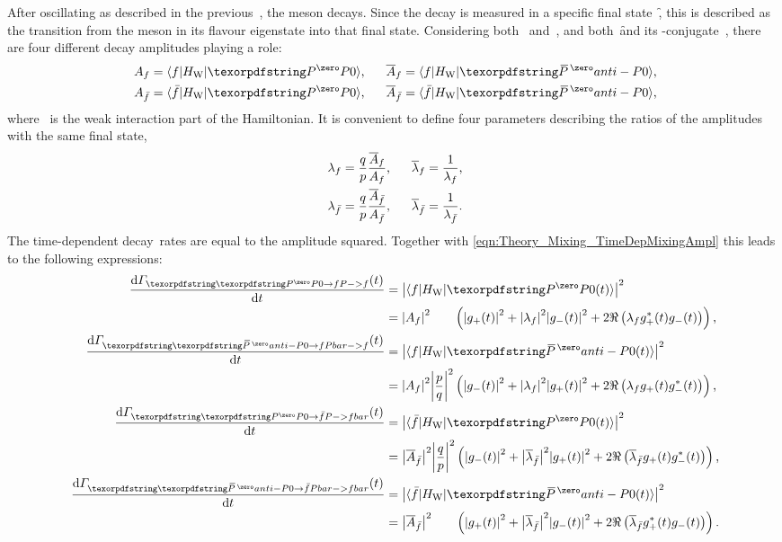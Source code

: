 After oscillating as described in the previous~, the meson decays.
Since the decay is measured in a specific final state~\f, this is described as the transition from the meson in its flavour eigenstate into that final state.
Considering both~\ket{\pz} and~\ket{\pzb}, and both~\f and its \CP-conjugate~\fb, there are four different decay amplitudes playing a role:
%
\begin{equation}
    \begin{alignedat}{2}
        \Af  &= \braxket{\f} {\Hweak}{\pz} \rlap{,} & \qquad \Abf  &= \braxket{\f} {\Hweak}{\pzb} \rlap{,} \\
        \Afb &= \braxket{\fb}{\Hweak}{\pz} \rlap{,} &        \Abfb &= \braxket{\fb}{\Hweak}{\pzb} \rlap{,} \\
    \end{alignedat}
\end{equation}
%
where \Hweak~is the weak interaction part of the Hamiltonian.
It is convenient to define four parameters describing the ratios of the amplitudes with the same final state,
%
\begin{equation}
    \begin{alignedat}{2}
        \lf   &= \frac{q}{p} \frac{\Abf}{\Af}   \rlap{,} & \qquad \lbf  &= \dfrac{1}{\lf}  \rlap{,} \\
        \lfb  &= \frac{q}{p} \frac{\Abfb}{\Afb} \rlap{,} &        \lbfb &= \dfrac{1}{\lfb} \rlap{.}
    \end{alignedat}
\end{equation}
%
The time-dependent decay~rates are equal to the amplitude squared.
Together with \cref{eqn:Theory_Mixing_TimeDepMixingAmpl} this leads to the following expressions:
%
\begin{align*}
    \dfrac{\deriv\Gamma_{\PzF} (t)} {\deriv t} &= \abs{\braxket{\f}{\Hweak}{\pz(t)}}^{2}   \\
        &= \abs{\Af}^{2}   \hphantom{\abs{\dfrac{q}{p}}^{2}} \left(\abs{\gpt}^{2} + \abs{\lf  }^{2} \abs{\gmt}^{2} + 2\Re\left(\lf   \gpst \gmt  \right)\right) \rlap{,} \\
    \dfrac{\deriv\Gamma_{\PzbF}(t)} {\deriv t} &= \abs{\braxket{\f}{\Hweak}{\pzb(t)}}^{2} \\
        &= \abs{\Af  }^{2}           \abs{\dfrac{p}{q}}^{2}  \left(\abs{\gmt}^{2} + \abs{\lf  }^{2} \abs{\gpt}^{2} + 2\Re\left(\lf   \gpt  \gmst \right)\right) \rlap{,} \\
    \dfrac{\deriv\Gamma_{\PzFb}(t)} {\deriv t} &= \abs{\braxket{\fb}{\Hweak}{\pz(t)}}^{2} \\
        &= \abs{\Abfb}^{2}           \abs{\dfrac{q}{p}}^{2}  \left(\abs{\gmt}^{2} + \abs{\lbfb}^{2} \abs{\gpt}^{2} + 2\Re\left(\lbfb \gpt  \gmst \right)\right) \rlap{,} \\
    \dfrac{\deriv\Gamma_{\PzbFb}(t)}{\deriv t} &= \abs{\braxket{\fb}{\Hweak}{\pzb(t)}}^{2}\\
        &= \abs{\Abfb}^{2} \hphantom{\abs{\dfrac{p}{q}}^{2}} \left(\abs{\gpt}^{2} + \abs{\lbfb}^{2} \abs{\gmt}^{2} + 2\Re\left(\lbfb \gpst \gmt  \right)\right) \rlap{.}
\end{align*}
